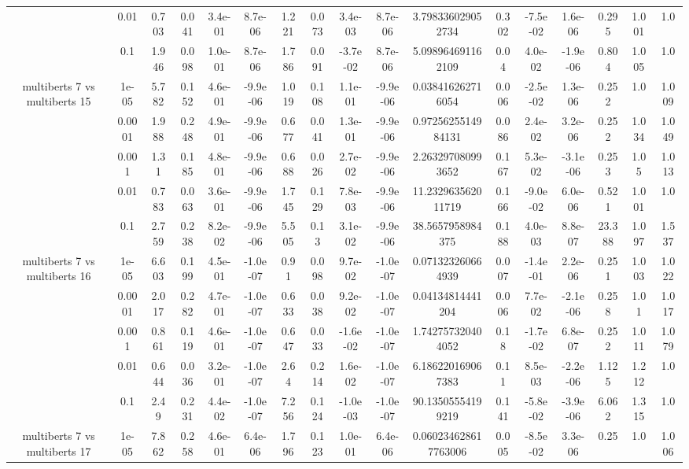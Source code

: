 \begin{tabular}{|c|c|c|c|c|c|c|c|c|c|c|c|c|c|c|c|c|}
 & 0.01 & 0.703 & 0.041 & 3.4e-01 & 8.7e-06 & 1.221 & 0.073 & 3.4e-03 & 8.7e-06 & 3.798336029052734 & 0.302 & -7.5e-02 & 1.6e-06 & 0.295 & 1.001 & 1.0 \\
 & 0.1 & 1.946 & 0.098 & 1.0e-01 & 8.7e-06 & 1.786 & 0.091 & -3.7e-02 & 8.7e-06 & 5.098964691162109 & 0.04 & 4.0e-02 & -1.9e-06 & 0.804 & 1.005 & 1.0 \\
\hline
\multirow{5}{*}{multiberts 7 vs multiberts 15} & 1e-05 & 5.782 & 0.152 & 4.6e-01 & -9.9e-06 & 1.019 & 0.108 & 1.1e-01 & -9.9e-06 & 0.038416262716054 & 0.006 & -2.5e-02 & 1.3e-06 & 0.252 & 1.0 & 1.009 \\
 & 0.0001 & 1.988 & 0.248 & 4.9e-01 & -9.9e-06 & 0.677 & 0.041 & 1.3e-01 & -9.9e-06 & 0.9725625514984131 & 0.086 & 2.4e-02 & 3.2e-06 & 0.252 & 1.034 & 1.049 \\
 & 0.001 & 1.31 & 0.185 & 4.8e-01 & -9.9e-06 & 0.688 & 0.026 & 2.7e-02 & -9.9e-06 & 2.263297080993652 & 0.167 & 5.3e-02 & -3.1e-06 & 0.253 & 1.05 & 1.013 \\
 & 0.01 & 0.783 & 0.063 & 3.6e-01 & -9.9e-06 & 1.745 & 0.129 & 7.8e-03 & -9.9e-06 & 11.232963562011719 & 0.166 & -9.0e-02 & 6.0e-06 & 0.521 & 1.001 & 1.0 \\
 & 0.1 & 2.759 & 0.238 & 8.2e-02 & -9.9e-06 & 5.505 & 0.13 & 3.1e-02 & -9.9e-06 & 38.5657958984375 & 0.188 & 4.0e-03 & 8.8e-07 & 23.388 & 1.097 & 1.537 \\
\hline
\multirow{5}{*}{multiberts 7 vs multiberts 16} & 1e-05 & 6.603 & 0.199 & 4.5e-01 & -1.0e-07 & 0.91 & 0.098 & 9.7e-02 & -1.0e-07 & 0.071323260664939 & 0.007 & -1.4e-01 & 2.2e-06 & 0.251 & 1.003 & 1.022 \\
 & 0.0001 & 2.017 & 0.282 & 4.7e-01 & -1.0e-07 & 0.633 & 0.038 & 9.2e-02 & -1.0e-07 & 0.04134814441204 & 0.006 & 7.7e-02 & -2.1e-06 & 0.258 & 1.01 & 1.017 \\
 & 0.001 & 0.861 & 0.119 & 4.6e-01 & -1.0e-07 & 0.647 & 0.033 & -1.6e-02 & -1.0e-07 & 1.742757320404052 & 0.18 & -1.7e-02 & 6.8e-07 & 0.252 & 1.011 & 1.079 \\
 & 0.01 & 0.644 & 0.036 & 3.2e-01 & -1.0e-07 & 2.64 & 0.214 & 1.6e-02 & -1.0e-07 & 6.186220169067383 & 0.11 & 8.5e-03 & -2.2e-06 & 1.125 & 1.212 & 1.0 \\
 & 0.1 & 2.49 & 0.231 & 4.4e-02 & -1.0e-07 & 7.256 & 0.124 & -1.0e-03 & -1.0e-07 & 90.13505554199219 & 0.141 & -5.8e-02 & -3.9e-06 & 6.062 & 1.315 & 1.0 \\
\hline
\multirow{5}{*}{multiberts 7 vs multiberts 17} & 1e-05 & 7.862 & 0.258 & 4.6e-01 & 6.4e-06 & 1.796 & 0.123 & 1.0e-01 & 6.4e-06 & 0.060234628617763006 & 0.005 & -8.5e-02 & 3.3e-06 & 0.25 & 1.0 & 1.006 \\

\end{tabular}

